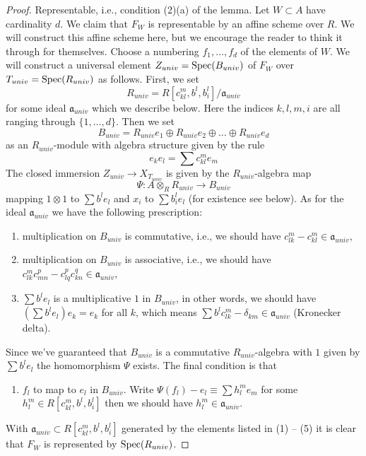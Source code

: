\begin{proof}
\medskip\noindent
Representable, i.e., condition (2)(a) of the lemma. Let $W \subset A$
have cardinality $d$. We claim that $F_W$ is representable by an affine
scheme over $R$. We will construct this affine scheme here, but we encourage
the reader to think it through for themselves. Choose a numbering
$f_1, \ldots, f_d$ of the elements of $W$. We will construct a universal
element $Z_{univ} = \mathop{\mathrm{Spec}}(B_{univ})$ of $F_W$ over $T_{univ} = \mathop{\mathrm{Spec}}(R_{univ})$
as follows. First, we set
$$
R_{univ} = R[c_{kl}^m, b^l, b_i^l]/\mathfrak a_{univ}
$$
for some ideal $\mathfrak a_{univ}$ which we describe below.
Here the indices $k, l, m, i$ are all ranging through $\{1, \ldots, d\}$.
Then we set
$$
B_{univ} = R_{univ}e_1 \oplus R_{univ}e_2 \oplus \ldots \oplus R_{univ}e_d
$$
as an $R_{univ}$-module with algebra structure given by the rule
$$
e_ke_l = \sum c_{kl}^m e_m
$$
The closed immersion $Z_{univ} \to X_{T_{univ}}$ is given
by the $R_{univ}$-algebra map
$$
\Psi : A \otimes_R R_{univ} \longrightarrow B_{univ}
$$
mapping $1 \otimes 1$ to $\sum b^le_l$ and $x_i$ to $\sum b_i^le_l$
(for existence see below). As for the ideal $\mathfrak a_{univ}$
we have the following prescription:
\begin{enumerate}
\item multiplication on $B_{univ}$ is commutative, i.e.,
we should have $c_{lk}^m - c_{kl}^m \in \mathfrak a_{univ}$,
\item multiplication on $B_{univ}$ is associative, i.e.,
we should have $c_{lk}^m c_{m n}^p - c_{lq}^p c_{kn}^q \in \mathfrak a_{univ}$,
\item $\sum b^le_l$ is a multiplicative $1$ in $B_{univ}$,
in other words, we should have $(\sum b^le_l)e_k = e_k$ for all $k$,
which means $\sum b^lc_{lk}^m - \delta_{km} \in \mathfrak a_{univ}$
(Kronecker delta).
\end{enumerate}
Since we've guaranteed that $B_{univ}$ is a commutative
$R_{univ}$-algebra with $1$ given by $\sum b^le_l$ the homomorphism $\Psi$
exists. The final condition is that
\begin{enumerate}
\item[(5)] $f_l$ to map to $e_l$ in $B_{univ}$. Write
$\Psi(f_l) - e_l \equiv \sum h_l^me_m$ for some
$h_l^m \in R[c_{kl}^m, b^l, b_i^l]$
then we should have $h_l^m \in \mathfrak a_{univ}$.
\end{enumerate}
With $\mathfrak a_{univ} \subset R[c_{kl}^m, b^l, b_i^l]$ generated
by the elements listed in (1) -- (5)
it is clear that $F_W$ is represented by $\mathop{\mathrm{Spec}}(R_{univ})$.
\end{proof}

